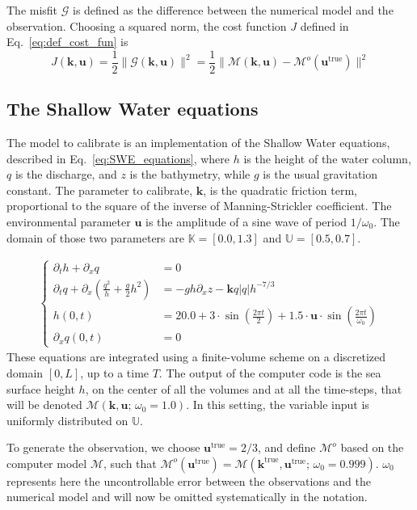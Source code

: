 \documentclass[preprint, 1p]{elsarticle}
\newcommand{\Kspace}{\mathbb{K}}
\newcommand{\Uspace}{\mathbb{U}}
\begin{document}
The misfit $\mathcal{G}$ is defined as the difference between the numerical model and the observation. Choosing a squared norm, the cost function $J$ defined in Eq.~\eqref{eq:def_cost_fun} is
\begin{equation}
J(\mathbf{k},\mathbf{u}) = \frac12 \| \mathcal{G}(\mathbf{k},\mathbf{u}) \|^2 = \frac12 \|\mathcal{M}(\mathbf{k},\mathbf{u}) - \mathcal{M}^{o}(\mathbf{u}^{\mathrm{true}}) \|^2
\end{equation}
\subsection{The Shallow Water equations}

The model to calibrate is an implementation of the Shallow Water equations, described in Eq.~\eqref{eq:SWE_equations}, where $h$ is the height of the water column, $q$ is the discharge, and $z$ is the bathymetry, while $g$ is the usual gravitation constant. The parameter to calibrate, $\mathbf{k}$, is the quadratic friction term, proportional to the square of the inverse of Manning-Strickler coefficient. The environmental parameter $\mathbf{u}$ is the amplitude of a sine wave of period $1/\omega_0$. The domain of those two parameters are $\Kspace = [0.0, 1.3]$ and $\Uspace = [0.5, 0.7]$.


\begin{align}
  \label{eq:SWE_equations}
  \left\{
    \begin{array}{rl}
      \partial_t h + \partial_x q &= 0 \\
      \partial_t q + \partial_x \left(\frac{q^2}{h} + \frac{g}{2}h^2\right) &= - gh\partial_x z - \mathbf{k}q |q|h^{-7/3} \\
      h(0, t) &= 20.0 + 3\cdot \sin \left(\frac{2\pi t}{2}\right) + 1.5\cdot \mathbf{u} \cdot \sin\left(\frac{2 \pi t}{\omega_0}\right)\\
      \partial_x q(0, t) &= 0
      \end{array}
  \right.
\end{align}
These equations are integrated using a finite-volume scheme on a discretized domain $[0, L]$, up to a time $T$. The output of the computer code is the sea surface height $h$, on the center of all the volumes and at all the time-steps, that will be denoted $\mathcal{M}(\mathbf{k},\mathbf{u};\, \omega_0=1.0)$.
In this setting, the variable input is uniformly distributed on $\Uspace$.

To generate the observation, we choose $\mathbf{u}^{\mathrm{true}}=2/3$, and define $\mathcal{M}^o$ based on the computer model $\mathcal{M}$, such that $\mathcal{M}^o(\mathbf{u}^{\mathrm{true}}) = \mathcal{M}(\mathbf{k}^{\mathrm{true}}, \mathbf{u}^{\mathrm{true}}; \, \omega_0 = 0.999)$. $\omega_0$  
represents here the uncontrollable error between the observations and the numerical model and will now be omitted systematically in the notation.
\end{document}
